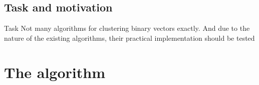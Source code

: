 \documentclass{beamer}
\begin{document}
\subsection{Task and motivation}
\begin{frame}
  \begin{block}{Task}
    Not many algorithms for clustering binary vectors exactly. And due to the
    nature of the existing algorithms, their practical implementation should be tested
  \end{block}
\end{frame}

\section{The algorithm}
\begin{frame}

\end{frame}
\end{document}
